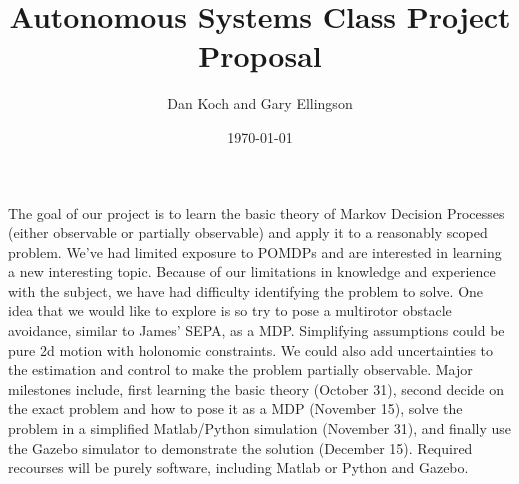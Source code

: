 \documentclass{article}
\title{Autonomous Systems Class Project Proposal}
\author{Dan Koch and Gary Ellingson}
\date{\today}
\begin{document}
\maketitle

The goal of our project is to learn the basic theory of Markov Decision Processes (either observable or partially observable) and apply it to a reasonably scoped problem.  We've had limited exposure to POMDPs and are interested in learning a new interesting topic.  Because of our limitations in knowledge and experience with the subject, we have had difficulty identifying the problem to solve.  One idea that we would like to explore is so try to pose a multirotor obstacle avoidance, similar to James' SEPA, as a MDP.  Simplifying assumptions could be pure 2d motion with holonomic constraints. We could also add uncertainties to the estimation and control to make the problem partially observable. Major milestones include, first learning the basic theory (October 31), second decide on the exact problem and how to pose it as a MDP (November 15), solve the problem in a simplified Matlab/Python simulation (November 31), and finally use the Gazebo simulator to demonstrate the solution (December 15). Required recourses will be purely software, including Matlab or Python and Gazebo.
\end{document}
